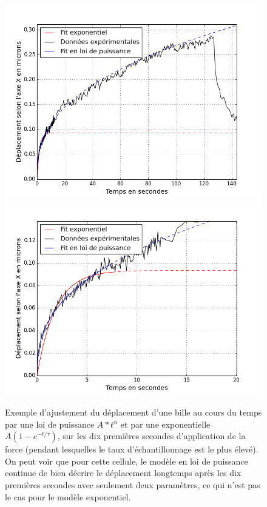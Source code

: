 \documentclass{report}
\begin{document}
\begin{figure}
\includegraphics[scale=0.5]{Exponentiel.png}
\includegraphics[scale=0.5]{Exponentiel_zoom.png}
\caption{\label{Fits comparés} Exemple d'ajustement du déplacement d'une bille au cours du temps par une loi de puissance $A*t^{\alpha}$ et par une exponentielle $A(1-e^{-t/\tau})$, sur les dix premières secondes d'application de la force (pendant lesquelles le taux d'échantillonnage est le plus élevé). On peut voir que pour cette cellule, le modèle en loi de puissance continue de bien décrire le déplacement longtemps après les dix premières secondes avec seulement deux paramètres, ce qui n'est pas le cas pour le modèle exponentiel. }
\end{figure}
\end{document}
